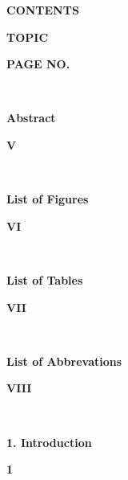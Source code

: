 \documentclass[12pt, English]{article}
\newcommand\tab[1][1cm]{\hspace*{#1}}
\begin{document}
\begin{titlepage}
\begin{center}
    \textbf{\Large CONTENTS}
\end{center}
\vspace*{0.20in}
\noindent 
{\begin{normalsize}
\textbf{\tab TOPIC}
\end{normalsize}
}
\hfill 
{
\begin{normalsize}
\textbf{PAGE NO.}
\end{normalsize}
}\\
\noindent 
{\begin{large}
\textbf{ \tab Abstract}
\end{large}
}
\hfill
{
\begin{normalsize}
\textbf{V}
\end{normalsize}
}\\
\noindent 
{\begin{large}
\textbf{ \tab List of Figures}
\end{large}
}
\hfill 
{
\begin{normalsize}
\textbf{VI}
\end{normalsize}
}\\
\noindent 
{\begin{large}
\textbf{ \tab List of Tables}
\end{large}
}
\hfill 
{
\begin{normalsize}
\textbf{VII}
\end{normalsize}
}\\
\noindent 
{\begin{large}
\textbf{ \tab List of Abbrevations}
\end{large}
}
\hfill 
{
\begin{normalsize}
\textbf{VIII}
\end{normalsize}
}\\
\noindent 
{\begin{large}
\textbf{\tab 1. Introduction}
\end{large}
}
\hfill 
{
\begin{large}
\textbf{1}
\end{large}
}


\end{titlepage}
\end{document}
